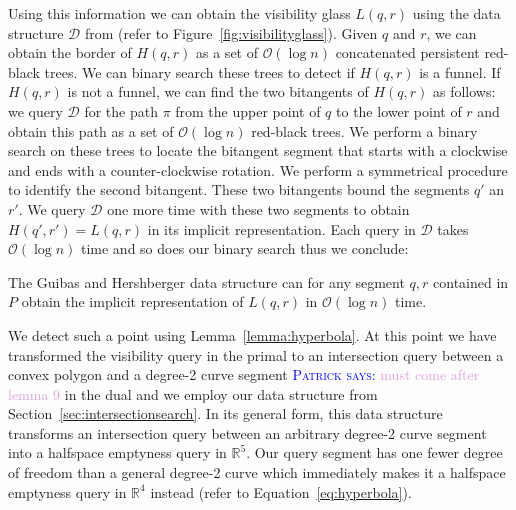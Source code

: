 \documentclass[UKenglish]{lipics-v2019}
\newcommand{\myremark}[4]{\textcolor{blue}{\textsc{#1 #2:}} \textcolor{#4}{\textsf{#3}}}
\newcommand{\patrick}[2][says]{\myremark{Patrick}{#1}{#2}{Plum}}
\begin{document}
Using this information we can obtain the visibility glass $L(q,r)$ using the data structure $\mathcal{D}$ from \cite{guibas1989optimal} (refer to Figure~\ref{fig:visibilityglass}). Given $q$ and $r$, we can obtain the border of $H(q,r)$ as a set of $\mathcal{O}(\log n)$ concatenated persistent red-black trees. We can binary search these trees to detect if $H(q,r)$ is a funnel. If $H(q,r)$ is not a funnel, we can find the two bitangents of $H(q,r)$ as follows: we query $\mathcal{D}$ for the path $\pi$ from the upper point of $q$ to the lower point of $r$ and obtain this path as a set of $\mathcal{O}(\log n)$ red-black trees. We perform a binary search on these trees to locate the bitangent segment that starts with a clockwise and ends with a counter-clockwise rotation. We perform a symmetrical procedure to identify the second bitangent.
These two bitangents bound the segments $q'$ an $r'$. We query $\mathcal{D}$ one more time with these two segments to obtain $H(q', r') = L(q,r)$ in its implicit representation. Each query in $\mathcal{D}$ takes $\mathcal{O}(\log n)$ time and so does our binary search thus we conclude:

\begin{lemma}
\label{lemma:visibilityquery}
  The Guibas and Hershberger data structure can for any segment $q,r$ contained in $P$ obtain the implicit representation of $L(q,r)$ in $\mathcal{O}(\log n)$ time.
\end{lemma}

 


We detect such a point using Lemma~\ref{lemma:hyperbola}. 
At this point we have transformed the visibility query in the primal to an intersection query between a convex polygon and a degree-2 curve segment \patrick{must come after lemma 9} in the dual and we employ our data structure from Section~\ref{sec:intersectionsearch}. In its general form, this data structure transforms an intersection query between an arbitrary degree-2 curve segment into a halfspace emptyness query in $\mathbb{R}^5$. Our query segment has one fewer degree of freedom than a general degree-2 curve which immediately makes it a halfspace emptyness query in $\mathbb{R}^4$ instead (refer to Equation~\ref{eq:hyperbola}).
\end{document}
